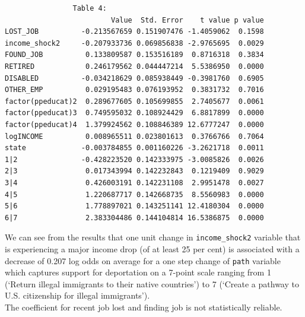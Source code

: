\documentclass[12pt,letterpaper]{article}
\begin{document}
\begin{Verbatim}
				Table 4:
                         Value  Std. Error    t value p value
LOST_JOB          -0.213567659 0.151907476 -1.4059062  0.1598
income_shock2     -0.207933736 0.069856838 -2.9765695  0.0029
FOUND_JOB          0.133809587 0.153516189  0.8716318  0.3834
RETIRED            0.246179562 0.044447214  5.5386950  0.0000
DISABLED          -0.034218629 0.085938449 -0.3981760  0.6905
OTHER_EMP          0.029195483 0.076193952  0.3831732  0.7016
factor(ppeducat)2  0.289677605 0.105699855  2.7405677  0.0061
factor(ppeducat)3  0.749595032 0.108924429  6.8817899  0.0000
factor(ppeducat)4  1.379924562 0.108846389 12.6777247  0.0000
logINCOME          0.008965511 0.023801613  0.3766766  0.7064
state             -0.003784855 0.001160226 -3.2621718  0.0011
1|2               -0.428223520 0.142333975 -3.0085826  0.0026
2|3                0.017343994 0.142232843  0.1219409  0.9029
3|4                0.426003191 0.142231108  2.9951478  0.0027
4|5                1.220687717 0.142668735  8.5560983  0.0000
5|6                1.778897021 0.143251141 12.4180304  0.0000
6|7                2.383304486 0.144104814 16.5386875  0.0000
\end{Verbatim}
We can see from the results that one unit change in \texttt{income\_shock2} variable that is experiencing a major income drop (of at least 25 per cent) is associated with a decrease of 0.207 log odds on average for a one step change of \texttt{path} variable which captures support for deportation on a 7-point scale ranging from 1 (‘Return illegal immigrants to their native countries’) to 7 (‘Create a pathway to U.S. citizenship for illegal immigrants’).\\
The coefficient for recent job lost and finding job is not statistically reliable.\\

\pagebreak
\end{document}
